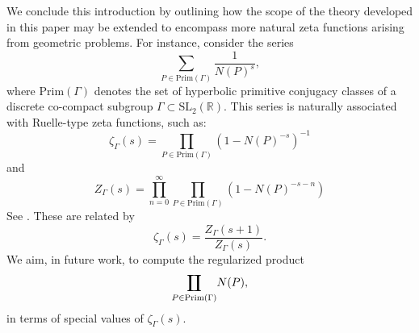 \documentclass[12pt]{amsart}
\DeclareMathOperator*\Rprod{%
\mathchoice
  {\ooalign{$\displaystyle\prod$\cr\hidewidth$\displaystyle\coprod$\hidewidth\cr}}%
  {\ooalign{$\textstyle\prod$\cr\hidewidth$\textstyle\coprod$\hidewidth\cr}}%
  {\ooalign{$\scriptstyle\prod$\cr\hidewidth$\scriptstyle\coprod$\hidewidth\cr}}%
  {\ooalign{$\scriptscriptstyle\prod$\cr\hidewidth$%
  \scriptscriptstyle\coprod$\hidewidth\cr}}}
\begin{document}
We conclude this introduction by outlining how the scope of the theory developed in this paper may be extended to encompass more natural zeta functions arising from geometric problems. For instance, consider the series
\[
\sum_{P \in \mathrm{Prim}(\Gamma)} \frac{1}{N(P)^s},
\]
where $\mathrm{Prim}(\Gamma)$ denotes the set of hyperbolic primitive conjugacy classes of a discrete co-compact subgroup $\Gamma \subset \mathrm{SL}_2(\mathbb{R})$. This series is naturally associated with Ruelle-type zeta functions, such as:
\[
\zeta_\Gamma(s) = \prod_{P \in \mathrm{Prim}(\Gamma)} \left(1 - N(P)^{-s}\right)^{-1}
\]
and
\[
Z_\Gamma(s) = \prod_{n=0}^\infty \prod_{P \in \mathrm{Prim}(\Gamma)} \left(1 - N(P)^{-s-n}\right)\tag{Higher Selberg zeta function}
\]
See \cite{Hejhal, Selberg1956, Kurokawa-1989, Kurokawa-2004}. These are related by  
\[
\zeta_\Gamma(s) = \frac{Z_\Gamma(s+1)}{Z_\Gamma(s)}.
\]
We aim, in future work, to compute the regularized product
\[
\underset{P \in \mathrm{Prim}(\Gamma)}{\Rprod} N(P),
\]
in terms of special values of $\zeta_\Gamma(s)$.

\end{document}
